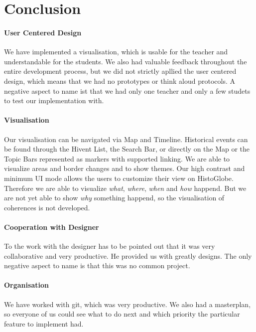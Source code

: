 \section{Conclusion} %
\label{sec:conclusion}

\paragraph{User Centered Design} %
We have implemented a visualisation, which is usable for the teacher and understandable for the students. We also had valuable feedback throughout the entire development process, but we did not strictly apllied the user centered design, which means that we had no prototypes or think aloud protocols. A negative aspect to name ist that we had only one teacher and only a few studets to test our implementation with.

\paragraph{Visualisation} %
Our visualisation can be navigated via Map and Timeline. Historical events can be found through the Hivent List, the Search Bar, or directly on the Map or the Topic Bars represented as markers with supported linking. We are able to visualize areas and border changes and to show themes. Our high contrast and minimum UI mode allows the users to customize their view on HistoGlobe. Therefore we are able to visualize \textit{what}, \textit{where}, \textit{when} and \textit{how} happend. But we are not yet able to show \textit{why} something happend, so the visualisation of coherences is not developed.

\paragraph{Cooperation with Designer} %
To the work with the designer has to be pointed out that it was very collaborative and very productive. He provided us with greatly designs. The only negative aspect to name is that this was no common project. %

\paragraph{Organisation} %
We have worked with git, which was very productive. We also had a masterplan, so everyone of us could see what to do next and which priority the particular feature to implement had.

